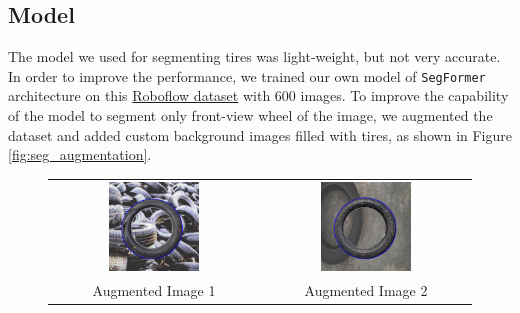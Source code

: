 \documentclass{article}
\begin{document}
\subsection{Model}
The model we used for segmenting tires was light-weight, but not very accurate. In order to improve the performance, we trained our own model of \texttt{SegFormer} architecture on this \href{https://universe.roboflow.com/segmentation-k0zny/tyre-wpkj0}{Roboflow dataset} with 600 images. To improve the capability of the model to segment only front-view wheel of the image, we augmented the dataset and added custom background images filled with tires, as shown in Figure \ref{fig:seg_augmentation}.

\begin{figure}[H]
    \centering
    \begin{tabular}{cc}
        \includegraphics[width=0.45\textwidth]{assets/seg_aug_dataset/aug0.png} &
        \includegraphics[width=0.45\textwidth]{assets/seg_aug_dataset/aug1.png}                            \\
        \small Augmented Image 1                                                & \small Augmented Image 2 \\[0.5em]


\end{tabular}
\end{figure}
\end{document}
